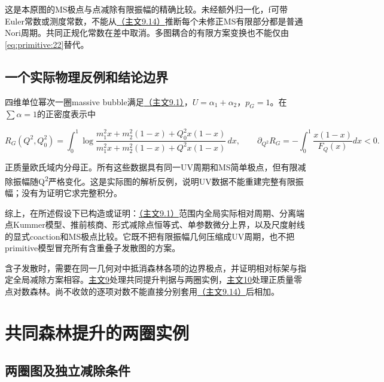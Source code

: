 \documentclass[11pt,a4paper,oneside]{ctexart}
\theoremstyle{cnplain}
\theoremstyle{definition}
\theoremstyle{remark}
\numberwithin{equation}{section}
\newcommand{\otherref}[2]{\href{#1.pdf}{#2}}
\begin{document}
这是本原图的MS极点与点减除有限振幅的精确比较。未经额外归一化，f可带Euler常数或测度常数，不能从\otherref{feynman_periods_long_paper}{（主文9.14）}推断每个未修正MS有限部分都是普通Nori周期。共同正规化常数在差中取消。多图耦合的有限方案变换也不能仅由\eqref{eq:primitive:22}替代。


\subsection{一个实际物理反例和结论边界}\label{sec:primitive:9}

四维单位幂次一圈massive bubble满足\otherref{feynman_periods_long_paper}{（主文9.1）}，\(U=\alpha _1+\alpha _2\)，\(p_G=1\)。在\(\sum \alpha =1\)的正密度表示中

\begin{equation}
R_G(Q^2,Q_0^2)=\int_0^1
 \log\frac{m_1^2x+m_2^2(1-x)+Q_0^2x(1-x)}
          {m_1^2x+m_2^2(1-x)+Q^2x(1-x)}\,dx,\qquad
 \partial_{Q^2}R_G=-\int_0^1\frac{x(1-x)}{F_Q(x)}dx<0.            \label{eq:primitive:23}
\end{equation}

正质量欧氏域内分母正。所有这些数据具有同一UV周期和MS简单极点，但有限减除振幅随Q\textsuperscript{2}严格变化。这是实际图的解析反例，说明UV数据不能重建完整有限振幅；没有为证明它求完整积分。

综上，在所述假设下已构造或证明：\otherref{feynman_periods_long_paper}{（主文9.1）}范围内全局实际相对周期、分离端点Kummer模型、推前核商、形式减除点恒等式、单参数微分上界，以及尺度射线的显式coaction和MS极点比较。它既不把有限振幅几何压缩成UV周期，也不把primitive模型冒充所有含重叠子发散图的方案。

含子发散时，需要在同一几何对中抵消森林各项的边界极点，并证明相对标架与指定全局减除方案相容。\otherref{feynman_periods_long_paper}{主文9}处理共同提升判据与两圈实例，\otherref{feynman_periods_long_paper}{主文10}处理正质量零点对数森林。尚不收敛的逐项对数不能直接分别套用\otherref{feynman_periods_long_paper}{（主文9.14）}后相加。



\endgroup

\section{共同森林提升的两圈实例}\label{supp:forest}

\begingroup

\subsection{两圈图及独立减除条件}\label{sec:forest:2}
\end{document}
